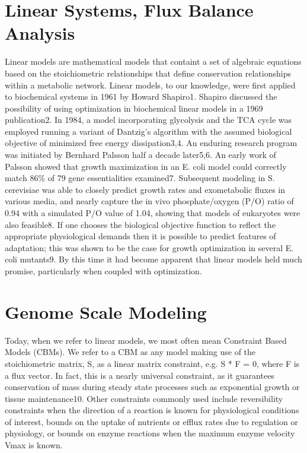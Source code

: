 \documentclass[phd,tocprelim,draft]{cornell}
\begin{document}
\section{Linear Systems, Flux Balance Analysis}
Linear models are mathematical models that containt a set of algebraic
equations based on the stoichiometric relationships that define
conservation relationships within a metabolic network.  Linear models,
to our knowledge, were first applied to biochemical systems in 1961 by
Howard Shapiro1. Shapiro discussed the possibility of using
optimization in biochemical linear models in a 1969 publication2. In
1984, a model incorporating glycolysis and the TCA cycle was employed
running a variant of Dantzig’s algorithm with the assumed biological
objective of minimized free energy dissipation3,4. An enduring
research program was initiated by Bernhard Palsson half a decade
later5,6.  An early work of Palsson showed that growth maximization in
an E. coli model could correctly match 86\% of 79 gene essentialities
examined7. Subsequent modeling in S. cerevisiae was able to closely
predict growth rates and exometabolic fluxes in various media, and
nearly capture the in vivo phosphate/oxygen (P/O) ratio of 0.94 with a
simulated P/O value of 1.04, showing that models of eukaryotes were
also feasible8. If one chooses the biological objective function to
reflect the appropriate physiological demands then it is possible to
predict features of adaptation; this was shown to be the case for
growth optimization in several E. coli mutants9. By this time it had
become apparent that linear models held much promise, particularly
when coupled with optimization.


\section{Genome Scale Modeling}
Today, when we refer to linear models, we most often mean Constraint
Based Models (CBMs). We refer to a CBM as any model making use of the
stoichiometric matrix, S, as a linear matrix constraint, e.g. S * F =
0, where F is a flux vector. In fact, this is a nearly universal
constraint, as it guarantees conservation of mass during steady state
processes such as exponential growth or tissue maintenance10. Other
constraints commonly used include reversibility constraints when the
direction of a reaction is known for physiological conditions of
interest, bounds on the uptake of nutrients or efflux rates due to
regulation or physiology, or bounds on enzyme reactions when the
maximum enzyme velocity Vmax is known.
\end{document}
